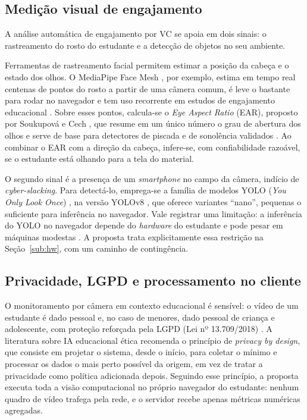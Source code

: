\documentclass[12pt,a4paper]{article}
\begin{document}
\subsection{Medição visual de engajamento}\label{sub:vc}

A análise automática de engajamento por VC se apoia em dois sinais: o rastreamento do rosto do estudante e a detecção de objetos no seu ambiente.

Ferramentas de rastreamento facial permitem estimar a posição da cabeça e o estado dos olhos. O MediaPipe Face Mesh \cite{LTN19,KAGG19}, por exemplo, estima em tempo real centenas de pontos do rosto a partir de uma câmera comum, é leve o bastante para rodar no navegador e tem uso recorrente em estudos de engajamento educacional \cite{AK24,DD25}. Sobre esses pontos, calcula-se o \emph{Eye Aspect Ratio} (EAR), proposto por Soukupová e Cech \cite{SC16}, que resume em um único número o grau de abertura dos olhos e serve de base para detectores de piscada e de sonolência validados \cite{MdCMSL20}. Ao combinar o EAR com a direção da cabeça, infere-se, com confiabilidade razoável, se o estudante está olhando para a tela do material.

O segundo sinal é a presença de um \emph{smartphone} no campo da câmera, indício de \emph{cyber-slacking}. Para detectá-lo, emprega-se a família de modelos YOLO (\emph{You Only Look Once}) \cite{RDGF16}, na versão YOLOv8 \cite{JCQ23}, que oferece variantes ``nano'', pequenas o suficiente para inferência no navegador. Vale registrar uma limitação: a inferência do YOLO no navegador depende do \emph{hardware} do estudante e pode pesar em máquinas modestas \cite{JCQ23}. A proposta trata explicitamente essa restrição na Seção~\ref{sub:hw}, com um caminho de contingência.

\subsection{Privacidade, LGPD e processamento no cliente}\label{sub:priv}

O monitoramento por câmera em contexto educacional é sensível: o vídeo de um estudante é dado pessoal e, no caso de menores, dado pessoal de criança e adolescente, com proteção reforçada pela LGPD (Lei nº 13.709/2018) \cite{Bra18}. A literatura sobre IA educacional ética \cite{HBF19,UNE21} recomenda o princípio de \emph{privacy by design}, que consiste em projetar o sistema, desde o início, para coletar o mínimo e processar os dados o mais perto possível da origem, em vez de tratar a privacidade como política adicionada depois. Seguindo esse princípio, a proposta executa toda a visão computacional no próprio navegador do estudante: nenhum quadro de vídeo trafega pela rede, e o servidor recebe apenas métricas numéricas agregadas.
\end{document}
